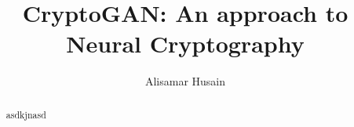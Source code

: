 \documentclass[12pt]{article}
\title{CryptoGAN: An approach to Neural Cryptography}
\author{Alisamar Husain}
\begin{document}
  \maketitle

  \begin{abstract}
    asdkjnasd
  \end{abstract}
\end{document}
